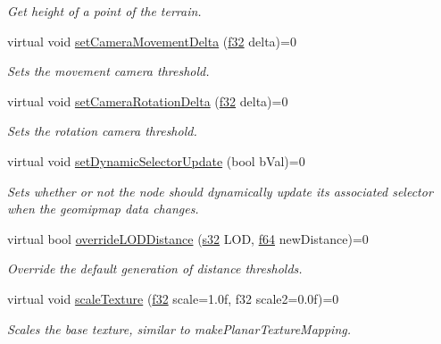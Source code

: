 \begin{DoxyCompactItemize}
\begin{DoxyCompactList}\small\item\em Get height of a point of the terrain. \end{DoxyCompactList}\item 
virtual void \hyperlink{classirr_1_1scene_1_1ITerrainSceneNode_af2c07f67c1c5319de4a796ec57950ec3}{set\+Camera\+Movement\+Delta} (\hyperlink{namespaceirr_a0277be98d67dc26ff93b1a6a1d086b07}{f32} delta)=0
\begin{DoxyCompactList}\small\item\em Sets the movement camera threshold. \end{DoxyCompactList}\item 
virtual void \hyperlink{classirr_1_1scene_1_1ITerrainSceneNode_ad11f3e54c291487c49868728a5228b5e}{set\+Camera\+Rotation\+Delta} (\hyperlink{namespaceirr_a0277be98d67dc26ff93b1a6a1d086b07}{f32} delta)=0
\begin{DoxyCompactList}\small\item\em Sets the rotation camera threshold. \end{DoxyCompactList}\item 
virtual void \hyperlink{classirr_1_1scene_1_1ITerrainSceneNode_a95cf695e54f1ef3376f7a3666c2dd834}{set\+Dynamic\+Selector\+Update} (bool b\+Val)=0
\begin{DoxyCompactList}\small\item\em Sets whether or not the node should dynamically update its associated selector when the geomipmap data changes. \end{DoxyCompactList}\item 
virtual bool \hyperlink{classirr_1_1scene_1_1ITerrainSceneNode_af98b54e1a59c014d60ea888eba6010d7}{override\+L\+O\+D\+Distance} (\hyperlink{namespaceirr_ac66849b7a6ed16e30ebede579f9b47c6}{s32} L\+OD, \hyperlink{namespaceirr_a1325b02603ad449f92c68fc640af9b28}{f64} new\+Distance)=0
\begin{DoxyCompactList}\small\item\em Override the default generation of distance thresholds. \end{DoxyCompactList}\item 
virtual void \hyperlink{classirr_1_1scene_1_1ITerrainSceneNode_aacfb35db09be74e32c22a10c7e13bbcc}{scale\+Texture} (\hyperlink{namespaceirr_a0277be98d67dc26ff93b1a6a1d086b07}{f32} scale=1.\+0f, f32 scale2=0.\+0f)=0
\begin{DoxyCompactList}\small\item\em Scales the base texture, similar to make\+Planar\+Texture\+Mapping. \end{DoxyCompactList}\item 

\end{DoxyCompactItemize}
